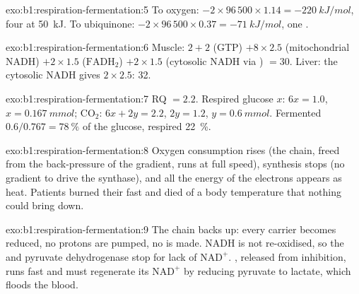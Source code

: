 \begin{solution}{exo:b1:respiration-fermentation:5}
To oxygen: $-2\times 96\,500\times 1.14 = \qty{-220}{kJ/mol}$, four 
at \qty{50}{kJ}. To ubiquinone: $-2\times 96\,500\times 0.37 =
\qty{-71}{kJ/mol}$, one .
\end{solution}

\begin{solution}{exo:b1:respiration-fermentation:6}
Muscle: $2 + 2$ (GTP) $+ 8\times 2.5$ (mitochondrial NADH) $+ 2\times
1.5$ ($\mathrm{FADH_2}$) $+ 2\times 1.5$ (cytosolic NADH via ) $=
30$. Liver: the cytosolic NADH gives $2\times 2.5$: 32.
\end{solution}

\begin{solution}{exo:b1:respiration-fermentation:7}
RQ $= 2.2$. Respired glucose $x$: $6x = 1.0$, $x = \qty{0.167}{mmol}$;
$\mathrm{CO_2}$: $6x + 2y = 2.2$, $2y = 1.2$, $y = \qty{0.6}{mmol}$.
Fermented $0.6/0.767 = \qty{78}{\%}$ of the glucose, respired
\qty{22}{\%}.
\end{solution}

\begin{solution}{exo:b1:respiration-fermentation:8}
Oxygen consumption rises (the chain, freed from the back-pressure of
the gradient, runs at full speed),  synthesis stops (no gradient to
drive the synthase), and all the energy of the electrons appears as
heat. Patients burned their  fast and died of a body temperature
that nothing could bring down.
\end{solution}

\begin{solution}{exo:b1:respiration-fermentation:9}
The chain backs up: every carrier becomes reduced, no protons are
pumped, no  is made. NADH is not re-oxidised, so the 
and pyruvate dehydrogenase stop for lack of $\mathrm{NAD^+}$.
, released from  inhibition, runs fast and must regenerate
its $\mathrm{NAD^+}$ by reducing pyruvate to lactate, which floods the
blood.
\end{solution}

